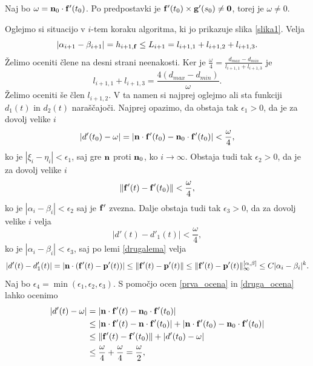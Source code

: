 Naj bo $\omega = {\bf n}_0\cdot {\bf f}'(t_0)$. Po predpostavki je ${\bf f}'(t_0)\times {\bf g}'(s_0) \neq {\bf 0}$, torej je $\omega \neq 0$.

Oglejmo si situacijo v $i$-tem koraku algoritma, ki jo prikazuje slika \ref{slika1}. Velja 
$$
|\alpha _{i+1}-\beta _{i+1}| = h_{i+1,{\bf f}} \leq L_{i+1} = l_{i+1,1} + l_{i+1,2} + l_{i+1,3}.
$$
Želimo oceniti člene na desni strani neenakosti. Ker je $\frac{\omega}{4} = \frac{d_{max}-d_{min}}{l_{i+1,1}  + l_{i+1,3}}$ je
\begin{equation}\label{lp13}
l_{i+1,1}  + l_{i+1,3} = \frac{4(d_{max} - d_{min})}{\omega}.
\end{equation}
Želimo oceniti še člen $l_{i+1,2}$. V ta namen si najprej oglejmo ali sta funkciji $d_1(t)$ in $d_2(t)$ naraščajoči. Najprej opazimo, da obstaja tak $\epsilon _1>0$, da je za dovolj velike $i$  
\begin{equation}\label{prva_ocena}
|d'(t_0) - \omega| = |{\bf n}\cdot {\bf f}'(t_0) - {\bf n}_0 \cdot {\bf f}'(t_0)| < \frac{\omega}{4},
\end{equation}
ko je $|\xi _i - \eta _i| < \epsilon _1$, saj gre ${\bf n}$ proti ${\bf n}_0$, ko $i\rightarrow\infty$. Obstaja tudi tak $\epsilon _2 > 0$, da je za dovolj velike $i$
\begin{equation}\label{druga_ocena}
\lVert {\bf f}'(t) - {\bf f}'(t_0)\rVert < \frac{\omega}{4},
\end{equation}
ko je $|\alpha _i - \beta _i| < \epsilon _2$ saj je ${\bf f}'$ zvezna. Dalje obstaja tudi tak $\epsilon _3 > 0$, da za dovolj velike $i$ velja
\begin{equation}\label{tretja_ocena}
|d'(t)-d'_1(t)| < \frac{\omega}{4},
\end{equation}
ko je $|\alpha _i - \beta _i| < \epsilon _3$, saj po lemi \ref{drugalema} velja
$$
|d'(t)-d'_1(t)| = |{\bf n}\cdot ({\bf f}'(t) - {\bf p}'(t))| \leq \lVert {\bf f}'(t) - {\bf p}'(t) \rVert \leq \lVert {\bf f}'(t) - {\bf p}'(t) \rVert _{\infty}^{[\alpha,\beta]} \leq C|\alpha _i- \beta_i|^k.
$$
Naj bo $\epsilon _4 = \min (\epsilon _1, \epsilon _2, \epsilon _3)$. S pomočjo ocen \ref{prva_ocena} in \ref{druga_ocena} lahko ocenimo
\begin{equation*}
\begin{split}
|d'(t)-\omega| & = |{\bf n}\cdot {\bf f}'(t) - {\bf n}_0\cdot{\bf f}'(t_0)| \\
& \leq |{\bf n}\cdot {\bf f}'(t) - {\bf n}\cdot{\bf f}'(t_0)| + 
|{\bf n}\cdot {\bf f}'(t_0) - {\bf n}_0\cdot{\bf f}'(t_0)|\\
&\leq \lVert {\bf f}'(t) - {\bf f}'(t_0)\rVert + |d'(t_0)-\omega|\\
&\leq \frac{\omega}{4} + \frac{\omega}{4} = \frac{\omega}{2},
\end{split}
\end{equation*}
